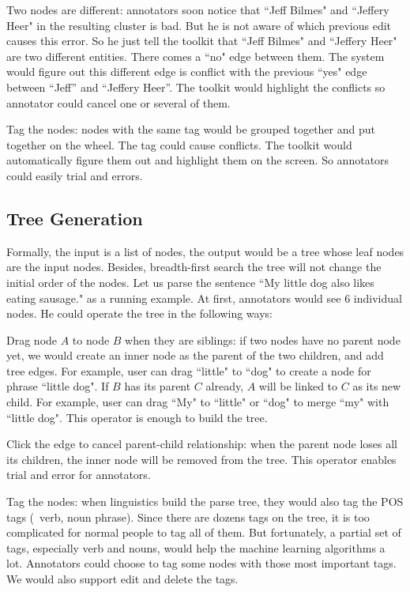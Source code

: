 Two nodes are different: annotators soon notice that ``Jeff Bilmes" and ``Jeffery Heer" in the resulting cluster is bad. But he is not aware of which previous edit causes this error. So he just tell the toolkit that ``Jeff Bilmes" and ``Jeffery Heer" are two different entities. There comes a ``no" edge between them. The system would figure out this different edge is conflict with the previous ``yes" edge between ``Jeff'' and ``Jeffery Heer''. The toolkit would highlight the conflicts so annotator could cancel one or several of them.

Tag the nodes: nodes with the same tag would be grouped together and put together on the wheel. The tag could cause conflicts. The toolkit would automatically figure them out and highlight them on the screen. So annotators could easily trial and errors. 


\subsection{Tree Generation}
Formally, the input is a list of nodes, the output would be a tree whose leaf nodes are the input nodes. Besides, breadth-first search the tree will not change the initial order of the nodes. Let us parse the sentence ``My little dog also likes eating sausage." as a running example. At first, annotators would see 6 individual nodes. He could operate the tree in the following ways: 

Drag node $A$ to node $B$ when they are siblings: if two nodes have no parent node yet, we would create an inner node as the parent of the two children, and add tree edges. For example, user can drag ``little" to ``dog" to create a node for phrase ``little dog". If $B$ has its parent $C$ already, $A$ will be linked to $C$ as its new child. For example, user can drag ``My" to ``little" or ``dog" to merge ``my" with ``little dog". This operator is enough to build the tree.

Click the edge to cancel parent-child relationship: when the parent node loses all its children, the inner node will be removed from the tree. This operator enables trial and error for annotators. 

Tag the nodes: when linguistics build the parse tree, they would also tag the POS tags (\ie\ verb, noun phrase). Since there are dozens tags on the tree, it is too complicated for normal people to tag all of them. But fortunately, a partial set of tags, especially verb and nouns, would help the machine learning algorithms a lot. Annotators could choose to tag some nodes with those most important tags. We would also support edit and delete the tags. 






